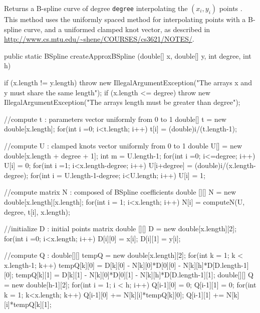 \begin{tabb}
   Returns a B-spline curve of degree \texttt{degree} interpolating the
   $(x_i, y_i)$ points \cite{mDEB78a}.
   This method uses the uniformly spaced method for interpolating
   points with a B-spline curve, and a uniformed clamped knot vector,
   as described in \url{http://www.cs.mtu.edu/~shene/COURSES/cs3621/NOTES/}.
\end{tabb}
\begin{htmlonly}
\end{htmlonly}

\begin{code}

   public static BSpline createApproxBSpline (double[] x, double[] y,
                                              int degree, int h) \begin{hide} {
      if (x.length != y.length)
         throw new IllegalArgumentException("The arrays x and y must share the same length");
      if (x.length <= degree)
         throw new IllegalArgumentException("The arrays length must be greater than degree");

      //compute t : parameters vector uniformly from 0 to 1
      double[] t = new double[x.length];
      for(int i =0; i<t.length; i++) {
         t[i] = (double)i/(t.length-1);
      }

      //compute U : clamped knots vector uniformly from 0 to 1
      double U[] = new double[x.length + degree + 1];
      int m = U.length-1;
      for(int i =0; i<=degree; i++)
         U[i] = 0;
      for(int i =1; i<x.length-degree; i++)
         U[i+degree] = (double)i/(x.length-degree);
      for(int i = U.length-1-degree; i<U.length; i++)
         U[i] = 1;


      //compute matrix N : composed of BSpline coefficients
      double [][] N = new double[x.length][x.length];
      for(int i = 1; i<x.length; i++) {
            N[i] = computeN(U, degree, t[i], x.length);
      }

      //initialize D : initial points matrix
      double [][] D = new double[x.length][2];
      for(int i =0; i<x.length; i++) {
         D[i][0] = x[i];
         D[i][1] = y[i];
      }

      //compute Q :
      double[][] tempQ = new double[x.length][2];
      for(int k = 1; k < x.length-1; k++) {
         tempQ[k][0] = D[k][0] - N[k][0]*D[0][0] - N[k][h]*D[D.length-1][0];
         tempQ[k][1] = D[k][1] - N[k][0]*D[0][1] - N[k][h]*D[D.length-1][1];
      }
      double[][] Q = new double[h-1][2];
      for(int i = 1; i < h; i++) {
         Q[i-1][0] = 0;
         Q[i-1][1] = 0;
         for(int k = 1; k<x.length; k++) {
            Q[i-1][0] += N[k][i]*tempQ[k][0];
            Q[i-1][1] += N[k][i]*tempQ[k][1];
         }
      }

}
\end{hide}
\end{code}
